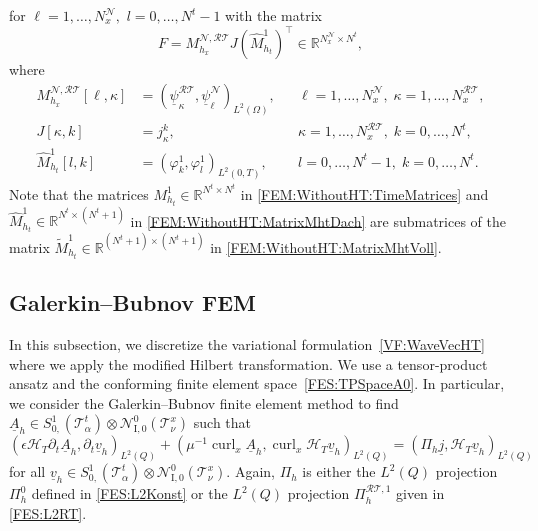 \documentclass[a4paper,11pt]{article}
\newcommand{\R}{\mathbb R}
\newcommand{\cu}{\operatorname{curl}}
\renewcommand{\vec}[1]{\underline{#1}}
\begin{document}
for  $\ell=1,\dots,N_x^{\mathcal{N}},$ $l = 0,\dots, N^t-1$ with the matrix
\begin{equation*}
	F = M_{h_x}^{\mathcal{N},\mathcal{RT}} J (\widehat M_{h_t}^1)^\top  \in \R^{N_x^{\mathcal{N}} \times N^t},
\end{equation*}
where
\begin{align}
	M_{h_x}^{\mathcal{N},\mathcal{RT}}[\ell,\kappa] &= (\vec \psi^\mathcal{RT}_\kappa, \vec \psi^\mathcal{N}_{\ell})_{L^2(\Omega)},  &&\ell=1,\dots,N_x^{\mathcal{N}}, \; \kappa=1,\dots,N_x^{\mathcal{RT}}, \label{FEM:WithoutHT:MasseNRT} \\
	J[\kappa,k] &= j_\kappa^k,  &&\kappa=1,\dots,N_x^{\mathcal{RT}}, \; k=0,\dots, N^t, \label{FEM:WithoutHT:Jdiv} \\
	\widehat M_{h_t}^1[l,k] &= (\varphi^1_k, \varphi^1_l)_{L^2(0,T)},  &&l=0,\dots,N^t-1, \; k=0,\dots, N^t.  \label{FEM:WithoutHT:MatrixMhtDach}
\end{align}
Note that the matrices $M_{h_t}^1 \in \R^{N^t \times N^t}$ in \eqref{FEM:WithoutHT:TimeMatrices} and $\widehat M_{h_t}^1 \in \R^{N^t \times (N^t+1)}$ in \eqref{FEM:WithoutHT:MatrixMhtDach} are submatrices of the matrix $\widetilde{M}_{h_t}^1 \in \R^{(N^t + 1) \times (N^t+1)}$ in \eqref{FEM:WithoutHT:MatrixMhtVoll}.


\subsection{Galerkin--Bubnov FEM}\label{Sec:GalerkinBubnovFEM}

In this subsection, we discretize the variational formulation~\eqref{VF:WaveVecHT} where we apply the modified Hilbert transformation. We use a tensor-product ansatz and the conforming finite element space~\eqref{FES:TPSpaceA0}. In particular, we consider the Galerkin--Bubnov finite element method to find $\vec A_h \in S_{0,}^1(\mathcal T^t_\alpha) \otimes \mathcal N_\mathrm{I,0}^0(\mathcal T^x_\nu)$ such that
\begin{equation}  \label{FEM:WithHT:DiskVFMitHT}
	(\epsilon \mathcal H_T \partial_t \vec A_h, \partial_t \vec v_h )_{L^2(Q)} + ( \mu^{-1}\cu_x \vec A_h, \cu_x \mathcal H_T \vec v_h )_{L^2(Q)}  = (\Pi_h \vec j, \mathcal H_T \vec v_h)_{L^2(Q)}
\end{equation}
for all $\vec v_h \in S_{0,}^1(\mathcal T^t_\alpha) \otimes \mathcal N_\mathrm{I,0}^0(\mathcal T^x_\nu)$. Again, $\Pi_h$ is either the $L^2(Q)$ projection $\Pi_h^0$ defined in \eqref{FES:L2Konst} or the $L^2(Q)$ projection $\Pi_h^{\mathcal{RT},1}$ given in \eqref{FES:L2RT}.
\end{document}
